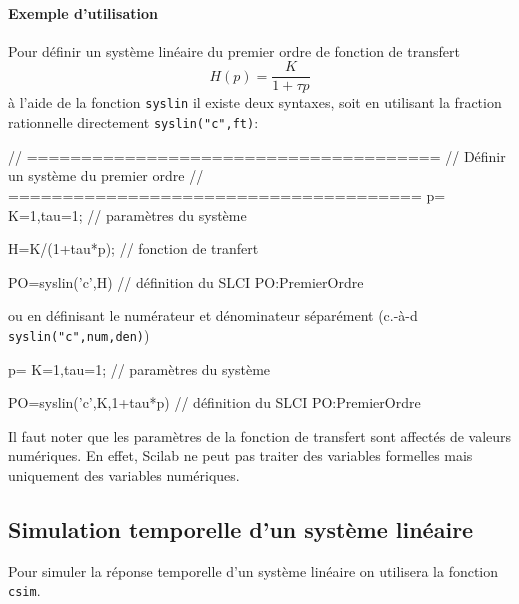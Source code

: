 \paragraph{Exemple d'utilisation}
Pour définir un système linéaire du premier ordre de fonction de transfert
$$
H(p)=\dfrac{K}{1+\tau p}
$$
à l'aide de la fonction \verb?syslin? il existe deux syntaxes, soit en 
utilisant la fraction rationnelle directement \verb?syslin("c",ft)?:
\begin{Scilabcode}
// ======================================
//  Définir un système du premier ordre
// ======================================
p=%
K=1,tau=1;             // paramètres du système

H=K/(1+tau*p);         // fonction de tranfert

PO=syslin('c',H)       // définition du SLCI PO:PremierOrdre
\end{Scilabcode}
ou en définisant le numérateur et dénominateur séparément 
(c.-à-d \verb?syslin("c",num,den)?)
\begin{Scilabcode}
p=%
K=1,tau=1;                // paramètres du système

PO=syslin('c',K,1+tau*p)  // définition du SLCI PO:PremierOrdre
\end{Scilabcode}

Il faut noter que les paramètres de la fonction de transfert sont affectés 
de valeurs numériques. En effet, Scilab ne peut pas traiter des variables 
formelles mais uniquement des variables \og numériques\fg.
\subsection{Simulation temporelle d'un système linéaire}
Pour simuler la réponse temporelle d'un système linéaire on utilisera la 
fonction \verb?csim?.


